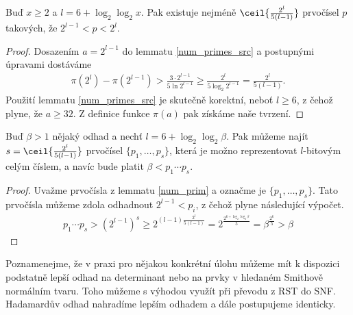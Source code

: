 \begin{lem} \label{num_prim}
Buď $ x \geq 2 $ a $ l = 6 + \log_2 \log_2 x $.
Pak existuje nejméně $ \ceil{\frac{2^{l}}{5 (l - 1)}} $ prvočísel $ p $
takových, že $ 2^{l - 1} < p < 2^l $.
\end{lem}
\begin{proof}
Dosazením $ a = 2^{l - 1} $ do lemmatu \ref{num_primes_src} a postupnými úpravami
dostáváme
\begin{align*}
    \pi(2^{l}) - \pi(2^{l - 1}) > \frac{3 \cdot 2^{l - 1}}{5 \ln{2^{l - 1}}}
                                \geq \frac{2^{l}}{5 \log_2{2^{l - 1}}}
                                = \frac{2^{l}}{5 (l - 1)}.
\end{align*}
Použití lemmatu \ref{num_primes_src} je skutečně korektní, neboť
$ l \geq 6 $, z čehož plyne, že $ a \geq 32 $. Z definice funkce $ \pi(a) $ pak
získáme naše tvrzení.
\end{proof}

\begin{dus} \label{num_prim_dus}
Buď $ \beta > 1 $ nějaký odhad a nechť $ l = 6 + \log_2 \log_2 \beta $. 
Pak můžeme najít
$ s = \ceil{\frac{2^{l}}{5 (l - 1)}} $ prvočísel $ \{p_1, \dots, p_s\} $,
která je možno reprezentovat $ l $-bitovým celým číslem, a navíc bude platit
$ \beta < p_1 \cdots p_s $.
\end{dus}
\begin{proof}
Uvažme prvočísla z lemmatu \ref{num_prim} a označme je $ \{p_1, \dots, p_s\} $.
Tato prvočísla můžeme zdola odhadnout $ 2^{l - 1} < p_i $,
z čehož plyne následující výpočet.
\begin{align*}
    p_1 \cdots p_s
        > (2^{l - 1}) ^ s
        \geq 2^{(l - 1) \frac{2^l}{5 (l - 1)}}
        = 2^{\frac{2^{6 + \log_2 \log_2 \beta}}{5}}
        = \beta^{\frac{2^6}{5}} > \beta
\end{align*}
\end{proof}



\begin{pozn}
Poznamenejme, že v praxi pro nějakou konkrétní úlohu můžeme mít k dispozici
podstatně lepší odhad na determinant nebo na prvky v hledaném Smithově normálním
tvaru. Toho můžeme s výhodou využít při převodu z RST do SNF. Hadamardův odhad
nahradíme lepším odhadem a dále postupujeme identicky.
\end{pozn}


